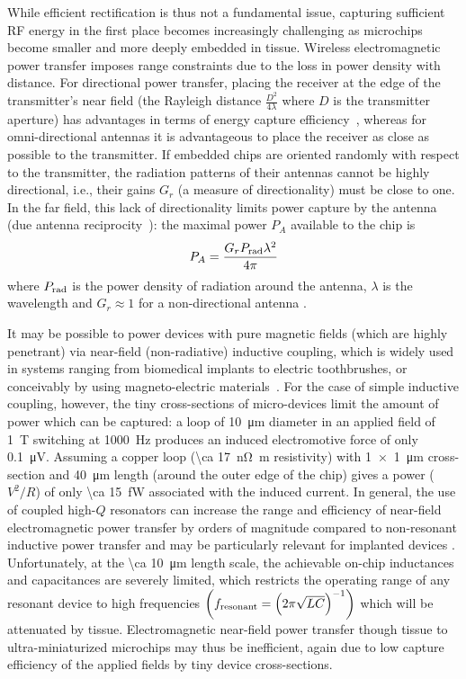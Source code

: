 While efficient rectification is thus not a fundamental issue, capturing sufficient RF energy in the first place becomes increasingly challenging as microchips become smaller and more deeply embedded in tissue. Wireless electromagnetic power transfer imposes range constraints due to the loss in power density with distance.
For directional power transfer, placing the receiver at the edge of the transmitter's near field (the Rayleigh distance $\frac{D^2}{4\lambda}$ where $D$ is the transmitter aperture) has advantages in terms of energy capture efficiency~\cite{ozeri10}, whereas for omni-directional antennas it is advantageous to place the receiver as close as possible to the transmitter. If embedded chips are oriented randomly with respect to the transmitter, the radiation patterns of their antennas cannot be highly directional, i.e., their gains $G_r$ (a measure of directionality) must be close to one. In the far field, this lack of directionality limits power capture by the antenna (due antenna reciprocity~\cite{gershenfeld2000physics}): the maximal power $P_A$ available to the chip is \[P_A = \frac{G_r P_{\text{\scriptsize rad}} \lambda^2}{4\pi}\] where $P_{\text{\scriptsize rad}}$ is the power density of radiation around the antenna, $\lambda$ is the wavelength and $G_r \approx 1$ for a non-directional antenna \cite{mandal07}.

It may be possible to power devices with pure magnetic fields (which are highly penetrant) via near-field (non-radiative) inductive coupling, which is widely used in systems ranging from biomedical implants to electric toothbrushes, or conceivably by using magneto-electric materials~\cite{Kitagawa2010, Priya2009, Yue2012, Fiebig2005}. For the case of simple inductive coupling, however, the tiny cross-sections of micro-devices limit the amount of power which can be captured: a loop of \SI{10}{\micro\meter} diameter in an applied field of \SI{1}{\tesla} switching at \SI{1000}{\hertz} produces an induced electromotive force of only \SI{0.1}{\micro\volt}. Assuming a copper loop (\SI{\ca 17}{\nano\ohm\meter} resistivity) with \SI{1 x 1}{\micro\meter} cross-section and \SI{40}{\micro\meter} length (around the outer edge of the chip) gives a power ($V^2/R$) of only \SI{\ca 15}{\femto\watt} associated with the induced current. In general, the use of coupled high-$Q$ resonators can increase the range and efficiency of near-field electromagnetic power transfer by orders of magnitude \cite{Karalis2008} compared to non-resonant inductive power transfer and may be particularly relevant for implanted devices \cite{Ho2013}. Unfortunately, at the \SI{\ca 10}{\micro\meter} length scale, the achievable on-chip inductances and capacitances are severely limited, which restricts the operating range of any resonant device to high frequencies $\left( f_{\text{\scriptsize resonant}} = \left(2\pi\sqrt{LC}\right)^{-1} \right)$ which will be attenuated by tissue. Electromagnetic near-field power transfer though tissue to ultra-miniaturized microchips may thus be inefficient, again due to low capture efficiency of the applied fields by tiny device cross-sections.


